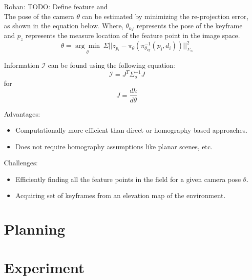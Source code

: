 \documentclass[conference]{IEEEtran}
\newcommand{\rohan}[1]{{\color{blue} Rohan: #1}}
\begin{document}
\rohan{TODO: Define feature and }
\\
The pose of the camera $\theta$ can be estimated by minimizing the re-projection error, as shown in the equation below. Where, $\theta_{kf}$ represents the pose of the keyframe and $p_z$ represents the measure location of the feature point in the image space.
\begin{equation}
     \theta = \underset{\theta}{\arg\min}~\Sigma ||z_{p_i} - \pi_\theta(\pi^{-1}_{\theta_{kf}}(p_i,d_i))||^2_{\Sigma_o}
\end{equation}

Information $\mathcal{I}$ can be found using the following equation:
\begin{equation}
     \mathcal{I} = J^{T}\Sigma^{-1}_{o}J
\end{equation}
for
\begin{equation}
     J = \frac{dh}{d\theta}
\end{equation}

Advantages:
\begin{itemize}
    \item Computationally more efficient than direct or homography based approaches.
    \item Does not require homography assumptions like planar scenes, etc.
\end{itemize}

Challenges:
\begin{itemize}
    \item Efficiently finding all the feature points in the field for a given camera pose $\theta$.
    \item Acquiring set of keyframes from an elevation map of the environment.
\end{itemize}

\section{Planning}\label{sec:planning}



\section{Experiment}\label{sec:experiment}
\end{document}
